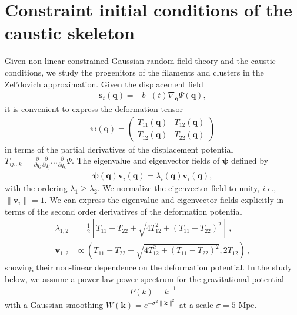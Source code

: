 \documentclass[a4paper, 11pt]{article}
\begin{document}
\section{Constraint initial conditions of the caustic skeleton}
Given non-linear constrained Gaussian random field theory and the caustic conditions, we study the progenitors of the filaments and clusters in the Zel'dovich approximation. Given the displacement field 
\begin{align}
\bm{s}_t(\bm{q}) = -b_+(t) \nabla_{\bm{q}} \Psi(\bm{q}),
\end{align}
it is convenient to express the deformation tensor
\begin{align}
\bm{\psi}(\bm{q}) = \begin{pmatrix} T_{11}(\bm{q}) & T_{12}(\bm{q}) \\ T_{12}(\bm{q}) & T_{22}(\bm{q})\end{pmatrix}
\end{align}
in terms of the partial derivatives of the displacement potential $T_{ij\dots k}=\frac{\partial}{\partial q_i}\frac{\partial}{\partial q_j}\dots \frac{\partial}{\partial q_k}\Psi$. The eigenvalue and eigenvector fields of $\bm{\psi}$ defined by
\begin{align}
\bm{\psi}(\bm{q}) \bm{v}_i(\bm{q}) = \lambda_i(\bm{q}) \bm{v}_i(\bm{q}),
\end{align}
with the ordering $\lambda_1\geq \lambda_2$. We normalize the eigenvector field to unity, \textit{i.e.}, $\|\bm{v}_{i}\|=1$. We can express the eigenvalue and eigenvector fields explicitly in terms of the second order derivatives of the deformation potential
\begin{align}
\lambda_{1,2} &= \frac{1}{2}\left[T_{11}+T_{22} \pm \sqrt{4 T_{12}^2+(T_{11}-T_{22})^2}\right]\,,\\
\bm{v}_{1,2} &\propto \left(T_{11}-T_{22} \pm \sqrt{4 T_{12}^2+(T_{11}-T_{22})^2}, 2 T_{12}\right)\,,
\end{align}
showing their non-linear dependence on the deformation potential. In the study below, we assume a power-law power spectrum for the gravitational potential
\begin{align}
P(k)=k^{-1}
\end{align}
with a Gaussian smoothing $W(\bm{k})=e^{-\sigma^2 \|\bm{k}\|^2}$ at a scale $\sigma = 5 \text{ Mpc}$.

\end{document}
